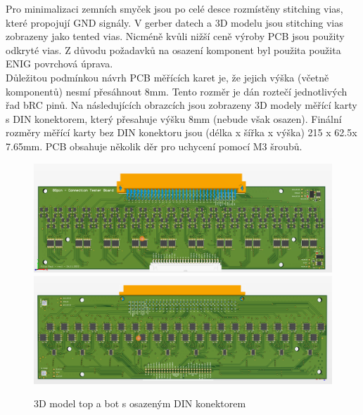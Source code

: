 \clearpage

Pro minimalizaci zemních smyček jsou po celé desce rozmístěny stitching vias,
které propojují GND signály.
V gerber datech a 3D modelu jsou stitching vias zobrazeny jako tented vias. Nicméně kvůli nižší ceně výroby PCB
jsou použity odkryté vias.
Z důvodu požadavků na osazení komponent byl použita použita ENIG povrchová úprava.\\

Důležitou podmínkou návrh PCB měřících karet je, že jejich výška (včetně komponentů) nesmí přesáhnout 8mm.
Tento rozměr je dán roztečí jednotlivých řad bRC pinů. Na následujících obrazcích jsou zobrazeny 3D modely měřící karty
s DIN konektorem, který přesahuje výšku 8mm (nebude však osazen). Finální rozměry měřící karty bez DIN konektoru jsou
(délka x šířka x výška) 215 x 62.5x 7.65mm. PCB obsahuje několik děr pro uchycení pomocí M3 šroubů.


\begin{figure}[ht!]
    \centering
    \includegraphics[width = 1\textwidth]{obrazky/karta_3D.png}
    \includegraphics[width = 1\textwidth]{obrazky/karta_3D_bot.png}
    \caption{3D model top a bot s osazeným DIN konektorem}
    \label{fig:3D model top a bot}
    
\end{figure}



